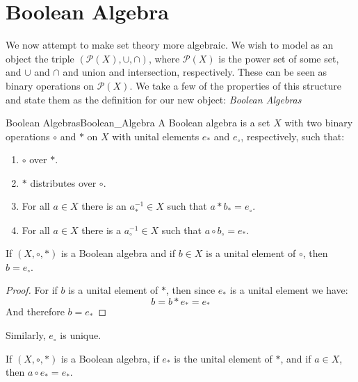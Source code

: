 \section{Boolean Algebra}
    We now attempt to make set theory more algebraic. We wish to model
    as an object the triple $(\mathcal{P}(X),\cup,\cap)$, where
    $\mathcal{P}(X)$ is the \gls{power set} of some set, and $\cup$ and
    $\cap$ and union and intersection, respectively. These can be seen as
    binary operations on $\mathcal{P}(X)$. We take a few of the properties
    of this structure and state them as the definition for our new object:
    \textit{Boolean Algebras}
    \begin{fdefinition}{Boolean Algebras}{Boolean_Algebra}
        A Boolean algebra is a set $X$ with two
         \glspl{binary operation}
        $\circ$ and $*$ on $X$ with \glspl{unital element} $e_{*}$ and
        $e_{\circ}$, respectively, such that:
        \begin{enumerate}
            \item   $\circ$ 
                    over $*$.
            \item   $*$ distributes over $\circ$.
            \item   For all $a\in{X}$ there is an $a_{*}^{\minus{1}}\in{X}$
                    such that $a*b_{*}=e_{\circ}$.
            \item   For all $a\in{X}$ there is a $a_{\circ}^{\minus{1}}\in{X}$
                    such that $a\circ{b}_{\circ}=e_{*}$.
        \end{enumerate}
    \end{fdefinition}
    \begin{theorem}
        If $(X,\circ,*)$ is a Boolean algebra and if $b\in{X}$ is a
        unital element of $\circ$, then $b=e_{\circ}$.
    \end{theorem}
    \begin{proof}
        For if $b$ is a unital element of $*$, then since $e_{*}$ is a
        unital element we have:
        \begin{equation}
            b=b*e_{*}=e_{*}
        \end{equation}
        And therefore $b=e_{*}$
    \end{proof}
    Similarly, $e_{\circ}$ is unique.
    \begin{theorem}
        If $(X,\circ,*)$ is a Boolean algebra, if $e_{*}$ is the unital
        element of $*$, and if $a\in{X}$, then $a\circ{e}_{*}=e_{*}$.
    \end{theorem}
